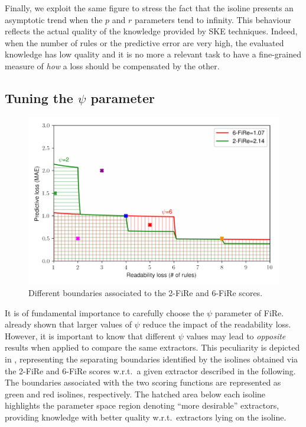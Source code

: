 \documentclass{article}
\newcommand{\fire}{FiRe}
\begin{document}
Finally, we exploit the same figure to stress the fact that the isoline presents an asymptotic trend when the $p$ and $r$ parameters tend to infinity.
%
This behaviour reflects the actual quality of the knowledge provided by SKE techniques.
%
Indeed, when the number of rules or the predictive error are very high, the evaluated knowledge has low quality and it is no more a relevant task to have a fine-grained measure of \emph{how} a loss should be compensated by the other.

\subsection{Tuning the $\psi$ parameter}\label{ssec:psi}

\begin{figure}
	\centering
	\includegraphics[width=\linewidth]{figures/areas.pdf}
	\caption{Different boundaries associated to the 2-\fire{} and 6-\fire{} scores.}\label{fig:areas}
\end{figure}

It is of fundamental importance to carefully choose the $\psi$ parameter of \fire{}.
%
 already shown that larger values of $\psi$ reduce the impact of the readability loss.
%
However, it is important to know that different $\psi$ values may lead to \emph{opposite} results when applied to compare the same extractors.
%
This peculiarity is depicted in , representing the separating boundaries identified by the isolines obtained via the 2-\fire{} and 6-\fire{} scores w.r.t.\ a given extractor described in the following.
%
The boundaries associated with the two scoring functions are represented as green and red isolines, respectively.
%
The hatched area below each isoline highlights the parameter space region denoting ``more desirable'' extractors, providing knowledge with better quality w.r.t.\ extractors lying on the isoline.
\end{document}

